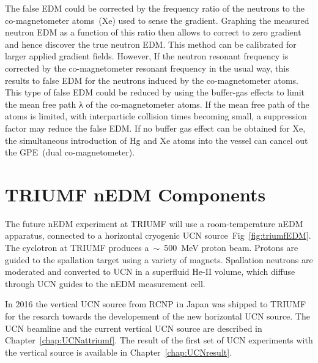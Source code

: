 The false EDM could be corrected by the frequency ratio of the
neutrons to the co-magnetometer atoms~(Xe) used to sense the
gradient. Graphing the measured neutron EDM as a function of this
ratio then allows to correct to zero gradient and hence discover the
true neutron EDM. This method can be calibrated for larger applied
gradient fields. However, If the neutron resonant frequency is
corrected by the co-magnetometer resonant frequency in the usual way,
this results to false EDM for the neutrons induced by the
co-magnetometer atoms. This type of false EDM could be reduced by
using the buffer-gas effects to limit the mean free path λ of the
co-magnetometer atoms. If the mean free path of the atoms is limited,
with interparticle collision times becoming small, a suppression
factor may reduce the false EDM. If no buffer gas effect can be
obtained for Xe, the simultaneous introduction of Hg and Xe atoms into
the vessel can cancel out the GPE~(dual co-magnetometer).



\section{TRIUMF nEDM Components}
The future nEDM experiment at TRIUMF will use a room-temperature nEDM
apparatus, connected to a horizontal cryogenic UCN
source~Fig~\ref{fig:triumfEDM}. 
The cyclotron at TRIUMF produces a~$\sim$~500~MeV proton beam. Protons
are guided to the spallation target using a variety of
magnets. Spallation neutrons are moderated and converted to UCN in a
superfluid He-II volume, which diffuse through UCN guides to the nEDM
measurement cell.

In 2016 the vertical UCN source from RCNP in Japan was shipped to TRIUMF for
the resarch towards the developement of the new horizontal UCN source.
The UCN beamline and the current vertical UCN source
are described in Chapter~\ref{chap:UCNattriumf}. The result of the
first set of UCN experiments with the vertical source is available in
Chapter~\ref{chap:UCNresult}.

